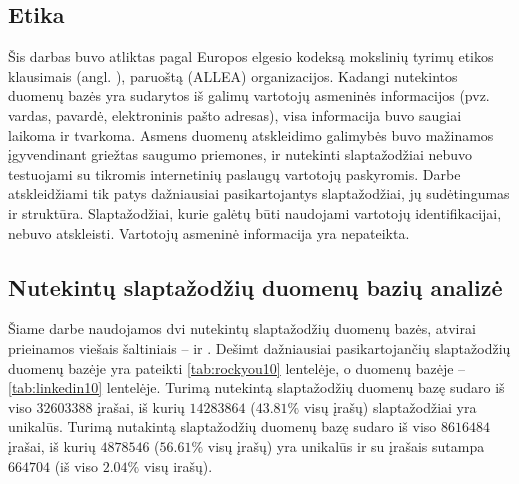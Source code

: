 \documentclass{VUMIFInfBakalaurinis}
\begin{document}
\subsection{Etika}
Šis darbas buvo atliktas pagal Europos elgesio kodeksą mokslinių tyrimų etikos 
klausimais
(angl. ), paruoštą 
 (ALLEA) 
organizacijos. Kadangi nutekintos duomenų bazės yra sudarytos iš galimų 
vartotojų asmeninės informacijos (pvz. vardas, pavardė, elektroninis pašto 
adresas), visa informacija buvo saugiai laikoma ir tvarkoma. Asmens duomenų 
atskleidimo galimybės buvo mažinamos įgyvendinant griežtas saugumo priemones, ir 
nutekinti slaptažodžiai nebuvo testuojami su tikromis internetinių paslaugų 
vartotojų paskyromis. Darbe atskleidžiami tik patys dažniausiai pasikartojantys 
slaptažodžiai, jų sudėtingumas ir struktūra. Slaptažodžiai, kurie galėtų būti 
naudojami vartotojų identifikacijai, nebuvo atskleisti. Vartotojų asmeninė 
informacija yra nepateikta.

\subsection{Nutekintų slaptažodžių duomenų bazių analizė} \label{sec:db-analize}
Šiame darbe naudojamos dvi nutekintų slaptažodžių duomenų bazės, atvirai 
prieinamos viešais šaltiniais --  ir . 
Dešimt dažniausiai pasikartojančių slaptažodžių duomenų bazėje 
 yra pateikti \ref{tab:rockyou10} lentelėje, o duomenų bazėje 
 -- \ref{tab:linkedin10} lentelėje. Turimą 
 nutekintą slaptažodžių duomenų bazę sudaro iš viso 
$32603388$ įrašai, iš kurių $14283864$ ($43.81 \%$ visų įrašų) slaptažodžiai yra 
unikalūs. Turimą  nutakintą slaptažodžių duomenų bazę sudaro 
iš viso $8616484$ įrašai, iš kurių $4878546$ ($56.61 \%$ visų įrašų) yra 
unikalūs ir su  įrašais sutampa $664704$ (iš viso $2.04 \%$ 
visų  irašų).
\end{document}
